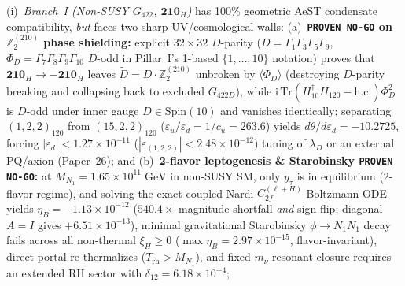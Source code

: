 \documentclass[11pt,a4paper]{article}
\begin{document}
\begin{enumerate}
\begin{itemize}
        (i)~\emph{Branch~I (Non-SUSY $G_{422}$, $\mathbf{210}_H$)} has 100\% geometric AeST condensate compatibility, \emph{but} faces two sharp UV/cosmological walls: (a)~\textbf{\texttt{PROVEN NO-GO} on $\mathbb{Z}_2^{(210)}$ phase shielding:} explicit $32\times 32$ $D$-parity ($D=\Gamma_1\Gamma_3\Gamma_5\Gamma_9$, $\Phi_D=\Gamma_7\Gamma_8\Gamma_9\Gamma_{10}$ $D$-odd in Pillar~I's 1-based $\{1,\dots,10\}$ notation) proves that $\mathbf{210}_H\to -\mathbf{210}_H$ leaves $\widetilde{D}=D\cdot\mathbb{Z}_2^{(210)}$ unbroken by $\langle\Phi_D\rangle$ (destroying $D$-parity breaking and collapsing back to excluded $G_{422D}$), while $\mathrm{i}\,\mathrm{Tr}(H_{10}^\dagger H_{120}-\mathrm{h.c.})\Phi_D^2$ is $D$-odd under inner gauge $D\in\mathrm{Spin}(10)$ and vanishes identically; separating $(1,2,2)_{120}$ from $(15,2,2)_{120}$ ($\varepsilon_u/\varepsilon_d = 1/c_u = 263.6$) yields $d\bar\theta/d\varepsilon_d = -10.2725$, forcing $|\varepsilon_d| < 1.27\times 10^{-11}$ ($|\varepsilon_{(1,2,2)}| < 2.48\times 10^{-12}$) tuning of $\lambda_D$ or an external PQ/axion (Paper~26); and (b)~\textbf{2-flavor leptogenesis \& Starobinsky \texttt{PROVEN NO-GO}:} at $M_{N_1}=1.65\times 10^{11}\;\mathrm{GeV}$ in non-SUSY SM, only $y_\tau$ is in equilibrium (2-flavor regime), and solving the exact coupled Nardi $C^{(\ell+H)}_{2f}$ Boltzmann ODE yields $\eta_B = -1.13\times 10^{-12}$ ($540.4\times$ magnitude shortfall \emph{and} sign flip; diagonal $A=I$ gives $+6.51\times 10^{-13}$), minimal gravitational Starobinsky $\phi\to N_1 N_1$ decay fails across all non-thermal $\xi_H\ge 0$ ($\max\eta_B = 2.97\times 10^{-15}$, flavor-invariant), direct portal re-thermalizes ($T_{\mathrm{rh}} > M_{N_1}$), and fixed-$m_\nu$ resonant closure requires an extended RH sector with $\delta_{12} = 6.18\times 10^{-4}$;

\end{itemize}
\end{enumerate}
\end{document}
